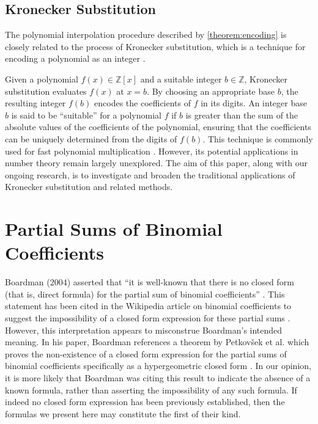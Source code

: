 \documentclass[10pt,a4paper]{article}
\theoremstyle{plain}
\begin{document}
\subsection{Kronecker Substitution} \label{subsection:kronecker}
The polynomial interpolation procedure described by \cref{theorem:encoding} is closely related to the process of Kronecker substitution, which is a technique for encoding a polynomial as an integer \cite{gathen2013modern}.

Given a polynomial $f(x) \in \mathbb{Z}[x]$ and a suitable integer $b \in \mathbb{Z}$, Kronecker substitution evaluates $f(x)$ at $x = b$. By choosing an appropriate base $b$, the resulting integer $f(b)$ encodes the coefficients of $f$ in its digits. An integer base $b$ is said to be ``suitable'' for a polynomial $f$ if $b$ is greater than the sum of the absolute values of the coefficients of the polynomial, ensuring that the coefficients can be uniquely determined from the digits of $f(b)$. This technique is commonly used for fast polynomial multiplication \cite{harvey2009kronecker, harvey2019faster, albrecht2018implementing, bos2020postquantum, greuet2022modular}. However, its potential applications in number theory remain largely unexplored. The aim of this paper, along with our ongoing research, is to investigate and broaden the traditional applications of Kronecker substitution and related methods.

\section{Partial Sums of Binomial Coefficients} \label{section:partialsums}
Boardman (2004) asserted that ``it is well-known that there is no closed form (that is, direct formula) for the partial sum of binomial coefficients'' \cite{boardman2004eggdropnumbers}. This statement has been cited in the Wikipedia article on binomial coefficients to suggest the impossibility of a closed form expression for these partial sums \cite{wikipedia2024binomialcoefficient}. However, this interpretation appears to misconstrue Boardman's intended meaning. In his paper, Boardman references a theorem by Petkovšek et al. which proves the non-existence of a closed form expression for the partial sums of binomial coefficients specifically as a hypergeometric closed form \cite{petkovsek1996ab}. In our opinion, it is more likely that Boardman was citing this result to indicate the absence of a known formula, rather than asserting the impossibility of any such formula. If indeed no closed form expression has been previously established, then the formulas we present here may constitute the first of their kind.
\end{document}
